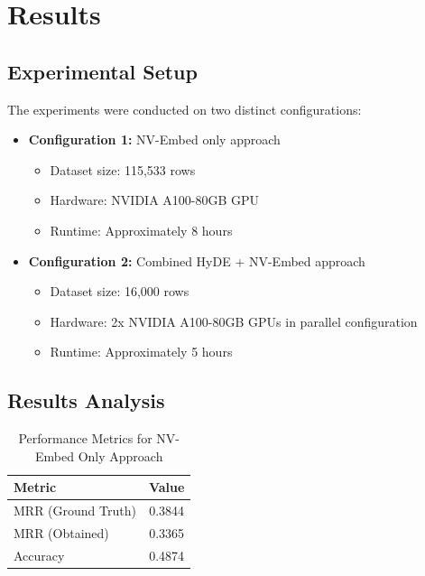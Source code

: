 \chapter{Results}
\label{C4} %
\clearpage
\section{Experimental Setup}
The experiments were conducted on two distinct configurations:

\begin{itemize}
    \item \textbf{Configuration 1:} NV-Embed only approach
    \begin{itemize}
        \item Dataset size: 115,533 rows
        \item Hardware: NVIDIA A100-80GB GPU
        \item Runtime: Approximately 8 hours
    \end{itemize}
    
    \item \textbf{Configuration 2:} Combined HyDE + NV-Embed approach
    \begin{itemize}
        \item Dataset size: 16,000 rows
        \item Hardware: 2x NVIDIA A100-80GB GPUs in parallel configuration
        \item Runtime: Approximately 5 hours
    \end{itemize}
\end{itemize}

\section{Results Analysis}

\begin{table}[ht]
    \centering
    \caption{Performance Metrics for NV-Embed Only Approach}
    \label{tab:nvembed_results}
    \begin{tabular}{|l|c|}
        \hline
        \textbf{Metric} & \textbf{Value} \\
        \hline
        MRR (Ground Truth) & 0.3844 \\
        MRR (Obtained) & 0.3365 \\
        Accuracy & 0.4874 \\
        \hline
    \end{tabular}
\end{table}

